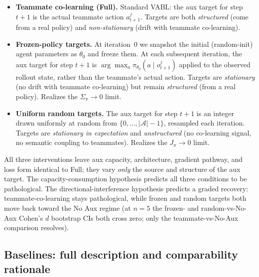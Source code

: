 \documentclass{article}
\theoremstyle{plain}
\theoremstyle{definition}
\theoremstyle{remark}
\begin{document}
\begin{itemize}
\item \textbf{Teammate co-learning (Full).} Standard VABL: the
aux target for step $t+1$ is the actual teammate action
$a_{t+1}^j$. Targets are both \emph{structured} (come from a real
policy) and \emph{non-stationary} (drift with teammate co-learning).
\item \textbf{Frozen-policy targets.} At iteration~0 we snapshot
the initial (random-init) agent parameters as $\theta_0$ and
freeze them. At each subsequent iteration, the aux target for step
$t+1$ is $\arg\max_a \pi_{\theta_0}(a \mid o_{t+1}^j)$ applied to
the observed rollout state, rather than the teammate's actual
action. Targets are \emph{stationary} (no drift with teammate
co-learning) but remain \emph{structured} (from a real policy).
Realizes the $\Sigma_\pi \to 0$ limit.
\item \textbf{Uniform random targets.} The aux target for step
$t+1$ is an integer drawn uniformly at random from
$\{0, \ldots, |\mathcal{A}| - 1\}$, resampled each iteration.
Targets are \emph{stationary in expectation} and
\emph{unstructured} (no co-learning signal, no semantic coupling
to teammates). Realizes the $J_\pi \to 0$ limit.
\end{itemize}

All three interventions leave aux capacity, architecture, gradient
pathway, and loss form identical to Full; they vary \emph{only}
the source and structure of the aux target. The
capacity-consumption hypothesis predicts all three conditions to
be pathological. The directional-interference hypothesis predicts
a graded recovery: teammate-co-learning stays pathological, while
frozen and random targets both move back toward the No Aux regime
(at $n{=}5$ the frozen- and random-vs-No-Aux Cohen's $d$ bootstrap
CIs both cross zero; only the teammate-vs-No-Aux comparison
resolves).

\subsection{Baselines: full description and comparability rationale}
\label{app:method_baselines}
\end{document}

